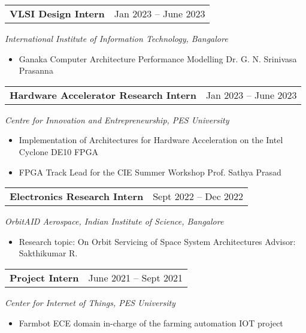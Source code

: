 \begin{tabular}{@{}p{4in}p{2in}}
  {\bf{VLSI Design Intern}} & Jan 2023 – June 2023 \\
\end{tabular}
\textit{International Institute of Information Technology, Bangalore}  
\begin{itemize}
    \setlength\itemsep{0em}
  \item Ganaka Computer Architecture Performance Modelling 
    \subitem Dr. G. N. Srinivasa Prasanna 
\end{itemize}

\begin{tabular}{@{}p{4in}p{2in}}
  {\bf{Hardware Accelerator Research Intern}}  & Jan 2023 – June 2023 \\
\end{tabular}
\textit{Centre for Innovation and Entrepreneurship, PES University} 
\begin{itemize}
    \setlength\itemsep{0em}
      \item Implementation of Architectures for Hardware Acceleration on the Intel
  Cyclone DE10 FPGA
      \item FPGA Track Lead for the CIE Summer Workshop
      \subitem Prof. Sathya Prasad 
\end{itemize}

\begin{tabular}{@{}p{4in}p{2in}}
  {\bf{Electronics Research Intern}} & Sept 2022 – Dec 2022 \\
\end{tabular}
\textit{OrbitAID Aerospace, Indian Institute of Science, Bangalore}  
\begin{itemize}
  \setlength\itemsep{0em}
  \item Research topic: On Orbit Servicing of Space System Architectures
  \subitem Advisor: Sakthikumar R.
\end{itemize}

\begin{tabular}{@{}p{4in}p{2in}}
  {\bf{Project Intern}} & June 2021 – Sept 2021 \\
\end{tabular}
\textit{Center for Internet of Things, PES University}  
\begin{itemize}
  \item Farmbot
  \subitem ECE domain in-charge of the farming automation IOT project
\end{itemize}
\endinput
